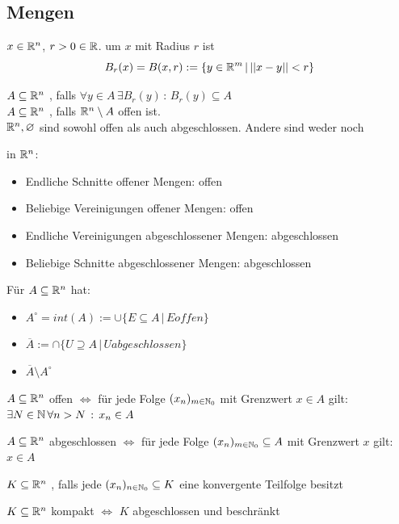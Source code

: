\subsection{Mengen}

\Def $x \in \mathbb{R}^n$, $r > 0 \in \mathbb{R}$.  um $x$ mit Radius $r$ ist
$$B_r(x) = B(x, r) := \{y \in \mathbb{R}^m \,|\, ||x - y|| < r\}$$ 

\Def $A \subseteq \mathbb{R}^n$ , falls $\forall y \in A \, \exists B_r(y) \,:\, B_r(y) \subseteq A$ \\
     $A \subseteq \mathbb{R}^n$ , falls $\mathbb{R}^n \setminus A$ offen ist. \\
     $\mathbb{R}^n, \varnothing$ sind sowohl offen als auch abgeschlossen. Andere sind weder noch

\Satz {} in $\mathbb{R}^n$:
\begin{itemize}
    \item Endliche Schnitte offener Mengen: offen
    \item Beliebige Vereinigungen offener Mengen: offen
    \item Endliche Vereinigungen abgeschlossener Mengen: abgeschlossen
    \item Beliebige Schnitte abgeschlossener Mengen: abgeschlossen
\end{itemize}

\Def Für $A \subseteq \mathbb{R}^n$ hat:
\begin{itemize}
    \item {} $A^\circ = int(A) := \cup\{E \subseteq A \,|\, E offen\}$
    \item {} $\overline{A} := \cap\{U \supseteq A \,|\, U abgeschlossen\}$
    \item {} $\overline{A} \setminus A^\circ$
\end{itemize}

\Satz $A \subseteq \mathbb{R}^n$ offen $\iff$ für jede Folge $(x_n)_{m \in \mathbb{N}_0}$ mit Grenzwert $x \in A$ gilt:
$\exists N \in \mathbb{N} \, \forall n > N \, : \, x_n \in A$

\Satz $A \subseteq \mathbb{R}^n$ abgeschlossen $\iff$ für jede Folge $(x_n)_{m \in \mathbb{N}_0} \subseteq A$ mit Grenzwert $x$ gilt: $x \in A$

\Def $K \subseteq \mathbb{R}^n$ , falls jede $(x_n)_{n \in \mathbb{N}_0} \subseteq K$ eine konvergente Teilfolge besitzt

\Satz $K \subseteq \mathbb{R}^n$ kompakt $\iff$ $K$ abgeschlossen und beschränkt
